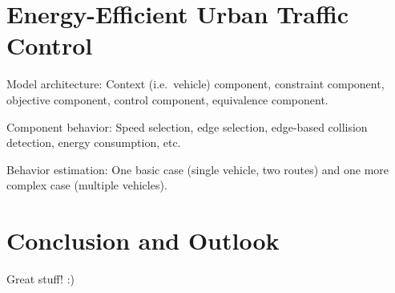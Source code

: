\documentclass[conference]{../cls/IEEEtran}
\begin{document}
\section{Energy-Efficient Urban Traffic Control}

Model architecture: Context (i.e.\ vehicle) component, constraint component, objective component, control component, equivalence component.

Component behavior: Speed selection, edge selection, edge-based collision detection, energy consumption, etc.

Behavior estimation: One basic case (single vehicle, two routes) and one more complex case (multiple vehicles).

\section{Conclusion and Outlook}

Great stuff! :)




\end{document}

